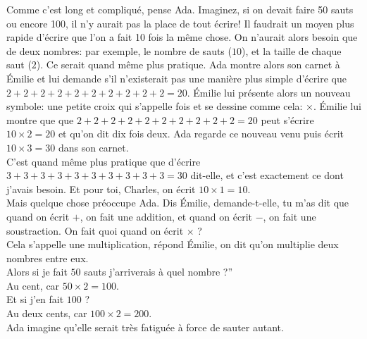 Comme c’est long et compliqué, pense Ada. 
Imaginez, si on devait faire 50 sauts ou encore 100, il n’y aurait pas la place de tout écrire! 
Il faudrait un moyen plus rapide d’écrire que l’on a fait 10 fois la même chose. On n’aurait alors besoin que de deux nombres: par exemple, le nombre de sauts ($10$), et la taille de chaque saut ($2$). Ce serait quand même plus pratique. 
Ada montre alors son carnet à Émilie et lui demande s'il n’existerait pas une manière plus simple d’écrire que $2+2+2+2+2+2+2+2+2+2=20$. Émilie lui présente alors un nouveau symbole: une petite croix qui s’appelle fois et se dessine comme cela: $\times$. Émilie lui montre que que $2+2+2+2+2+2+2+2+2+2=20$ peut s’écrire $10 \times 2 = 20$ et qu’on dit dix fois deux.
Ada regarde ce nouveau venu puis écrit $10 \times 3 = 30$ dans son carnet. 
\\
\guillemotleft C’est quand même plus pratique que d’écrire $3+3+3+3+3+3+3+3+3+3=30$ dit-elle, et c’est exactement ce dont j’avais besoin. Et pour toi, Charles, on écrit $10 \times 1 = 10$. \guillemotright\\
Mais quelque chose préoccupe Ada. 
\guillemotleft Dis Émilie, demande-t-elle, tu m’as dit que quand on écrit $+$, on fait une addition, et quand on écrit $-$, on fait une soustraction. On fait quoi quand on écrit $\times$ ?\\
\mdash Cela s’appelle une multiplication, répond Émilie, on dit qu’on multiplie deux nombres entre eux.\\
\mdash Alors si je fait $50$ sauts j’arriverais à quel nombre ?”\\
\mdash Au cent, car $50 \times 2 = 100$.\\
\mdash Et si j’en fait $100$ ?\\
\mdash Au deux cents, car $100 \times 2 = 200$. \guillemotright\\
Ada imagine qu'elle serait très fatiguée à force de sauter autant.
